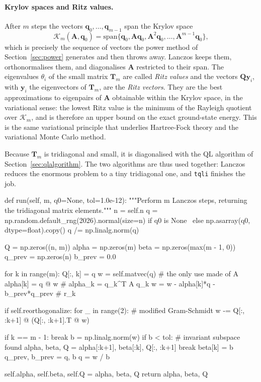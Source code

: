 \paragraph{Krylov spaces and Ritz values.}
After $m$ steps the vectors $\bm{q}_0,\dots,\bm{q}_{m-1}$ span the Krylov
space
\begin{equation}
  \mathcal{K}_m(\bm{A},\bm{q}_0)
   = \mathrm{span}\{\bm{q}_0,\bm{A}\bm{q}_0,\bm{A}^2\bm{q}_0,
                    \dots,\bm{A}^{m-1}\bm{q}_0\} ,
  \label{eq:1-krylov}
\end{equation}
which is precisely the sequence of vectors the power method of
Section~\ref{sec:power} generates and then throws away.  Lanczos keeps them,
orthonormalises them, and diagonalises $\bm{A}$ restricted to their span.  The
eigenvalues $\theta_i$ of the small matrix $\bm{T}_m$ are called \emph{Ritz
values} and the vectors $\bm{Q}\bm{y}_i$, with $\bm{y}_i$ the eigenvectors of
$\bm{T}_m$, are the \emph{Ritz vectors}.  They are the best approximations to
eigenpairs of $\bm{A}$ obtainable within the Krylov space, in the variational
sense: the lowest Ritz value is the minimum of the Rayleigh quotient over
$\mathcal{K}_m$, and is therefore an upper bound on the exact ground-state
energy.  This is the same variational principle that underlies Hartree-Fock
theory and the variational Monte Carlo method.

Because $\bm{T}_m$ is tridiagonal and small, it is diagonalised with the QL
algorithm of Section~\ref{sec:qlalgorithm}.  The two algorithms are thus used
together: Lanczos reduces the enormous problem to a tiny tridiagonal one, and
\texttt{tqli} finishes the job.

\begin{Python}{}
def run(self, m, q0=None, tol=1.0e-12):
    """Perform m Lanczos steps, returning the tridiagonal matrix elements."""
    n = self.n
    q = np.random.default_rng(2026).normal(size=n) if q0 is None \
        else np.asarray(q0, dtype=float).copy()
    q /= np.linalg.norm(q)

    Q = np.zeros((n, m))
    alpha = np.zeros(m)
    beta = np.zeros(max(m - 1, 0))
    q_prev = np.zeros(n)
    b_prev = 0.0

    for k in range(m):
        Q[:, k] = q
        w = self.matvec(q)                     # the only use made of A
        alpha[k] = q @ w                       # alpha_k = q_k^T A q_k
        w = w - alpha[k]*q - b_prev*q_prev     # r_k

        if self.reorthogonalize:
            for _ in range(2):                 # modified Gram-Schmidt
                w -= Q[:, :k+1] @ (Q[:, :k+1].T @ w)

        if k == m - 1:
            break
        b = np.linalg.norm(w)
        if b < tol:                            # invariant subspace found
            alpha, beta, Q = alpha[:k+1], beta[:k], Q[:, :k+1]
            break
        beta[k] = b
        q_prev, b_prev = q, b
        q = w / b

    self.alpha, self.beta, self.Q = alpha, beta, Q
    return alpha, beta, Q
\end{Python}

